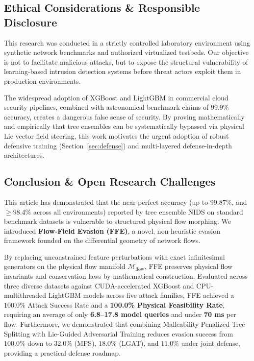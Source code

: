 \documentclass[pdflatex,sn-mathphys-num]{sn-jnl}
\theoremstyle{thmstyleone}
\theoremstyle{thmstyletwo}
\theoremstyle{thmstylethree}
\begin{document}
\subsection{Ethical Considerations \& Responsible Disclosure}
This research was conducted in a strictly controlled laboratory environment using synthetic network benchmarks and authorized virtualized testbeds. Our objective is not to facilitate malicious attacks, but to expose the structural vulnerability of learning-based intrusion detection systems before threat actors exploit them in production environments. 

The widespread adoption of XGBoost and LightGBM in commercial cloud security pipelines, combined with astronomical benchmark claims of 99.9\% accuracy, creates a dangerous false sense of security. By proving mathematically and empirically that tree ensembles can be systematically bypassed via physical Lie vector field steering, this work motivates the urgent adoption of robust defensive training (Section~\ref{sec:defense}) and multi-layered defense-in-depth architectures.

\subsection{Conclusion \& Open Research Challenges}
This article has demonstrated that the near-perfect accuracy (up to $99.87\%$, and $\ge 98.4\%$ across all environments) reported by tree ensemble NIDS on standard benchmark datasets is vulnerable to structured physical flow morphing. We introduced \textbf{Flow-Field Evasion (FFE)}, a novel, non-heuristic evasion framework founded on the differential geometry of network flows. 

By replacing unconstrained feature perturbations with exact infinitesimal generators on the physical flow manifold $\mathcal{M}_{\text{flow}}$, FFE preserves physical flow invariants and conservation laws by mathematical construction. Evaluated across three diverse datasets against CUDA-accelerated XGBoost and CPU-multithreaded LightGBM models across five attack families, FFE achieved a $100.0\%$ Attack Success Rate and a \textbf{100.0\% Physical Feasibility Rate}, requiring an average of only \textbf{6.8--17.8 model queries} and under \textbf{70 ms} per flow. Furthermore, we demonstrated that combining Malleability-Penalized Tree Splitting with Lie-Guided Adversarial Training reduces evasion success from $100.0\%$ down to $32.0\%$ (MPS), $18.0\%$ (LGAT), and $11.0\%$ under joint defense, providing a practical defense roadmap.
\end{document}
